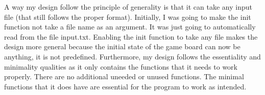 \documentclass[12pt]{article}
\begin{document}
\bigskip

\indent A way my design follow the principle of generality is that it can take any input file (that still follows the proper format). Initially, I was going to make the init function not take a file name as an argument. It was just going to automatically read from the file input.txt. Enabling the init function to take any file makes the design more general because the initial state of the game board can now be anything, it is not predefined. Furthermore, my design follows the essentiality and minimality qualities as it only contains the functions that it needs to work properly. There are no additional uneeded or unused functions. The minimal functions that it does have are essential for the program to work as intended.\\ \\
\end{document}
